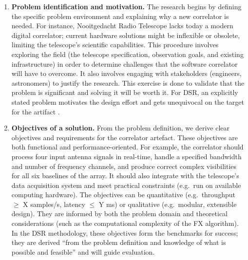 \begin{enumerate}
     \item \textbf{Problem identification and motivation.} The research begins by defining the specific problem environment and explaining why a new correlator is needed. For instance, Nooitgedacht Radio Telescope lacks today a modern digital correlator; current hardware solutions might be inflexible or obsolete, limiting the telescope's scientific capabilities. This procedure involves exploring the field (the telescope specification, observation goals, and existing infrastructure) in order to determine challenges that the software correlator will have to overcome. It also involves engaging with stakeholders (engineers, astronomers) to justify the research. This exercise is done to validate that the problem is significant and solving it will be worth it. For DSR, an explicitly stated problem motivates the design effort and gets unequivocal on the target for the artifact \citep{Hevner2004}.
 
     \item \textbf{Objectives of a solution.} From the problem definition, we derive clear objectives and requirements for the correlator artefact. These objectives are both functional and performance-oriented. For example, the correlator should process four input antenna signals in real-time, handle a specified bandwidth and number of frequency channels, and produce correct complex visibilities for all six baselines of the array. It should also integrate with the telescope’s data acquisition system and meet practical constraints (e.g.\ run on available computing hardware). The objectives can be quantitative (e.g.\ throughput $\geq$ X samples/s, latency $\leq$ Y ms) or qualitative (e.g.\ modular, extensible design). They are informed by both the problem domain and theoretical considerations (such as the computational complexity of the FX algorithm). In the DSR methodology, these objectives form the benchmarks for success; they are derived “from the problem definition and knowledge of what is possible and feasible” \citep{Peffers2007} and will guide evaluation.
 

\end{enumerate}
